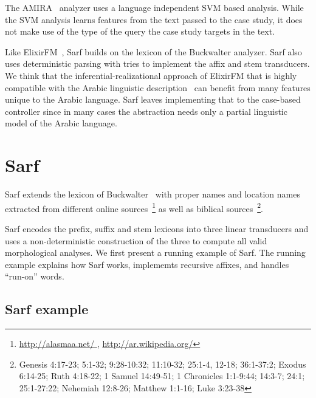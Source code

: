 \documentclass[11pt]{article}
\begin{document}
The AMIRA~\cite{Diab:07} analyzer uses 
a language independent SVM based analysis. 
While the SVM analysis learns features from the text passed to the case
study, it does not make use of the type of the query the 
case study targets in the text. 

Like ElixirFM~\cite{Otakar:07}, Sarf builds on the lexicon
of the Buckwalter analyzer. 
Sarf also uses deterministic parsing with tries 
to implement the affix and stem transducers. 
We think that the inferential-realizational approach 
of ElixirFM
that is highly compatible with the Arabic linguistic 
description~\cite{Badawi:04}
can benefit from many features unique to the Arabic language.
Sarf leaves implementing that to the case-based controller
since in many cases the abstraction needs only a partial 
linguistic model of the Arabic language. 

\section{Sarf}
\label{sec:sarf}

Sarf extends the lexicon of Buckwalter~ with 
proper names and location names extracted from different online 
sources~\footnote{\href{http://alasmaa.net/}{http://alasmaa.net/ }, 
\href{http://ar.wikipedia.org/}{http://ar.wikipedia.org/}}
as well as biblical sources~\footnote{Genesis 4:17-23; 5:1-32; 9:28-10:32; 11:10-32; 25:1-4, 12-18; 36:1-37:2; Exodus 6:14-25; Ruth 4:18-22; 1 Samuel 14:49-51; 1 Chronicles 1:1-9:44; 14:3-7; 24:1; 25:1-27:22; Nehemiah 12:8-26; Matthew 1:1-16; Luke 3:23-38}.

Sarf encodes the prefix, suffix and stem lexicons into 
three linear transducers and uses a non-deterministic construction
of the three to compute all valid morphological analyses.
We first present a running example of Sarf. 
The running example explains how Sarf works, 
implememts recursive affixes, and
handles ``run-on'' words.

\subsection{Sarf example}
\label{sec:example}

\transfalse
\begin{figure}[tb]
\end{figure}
\transtrue
\end{document}
